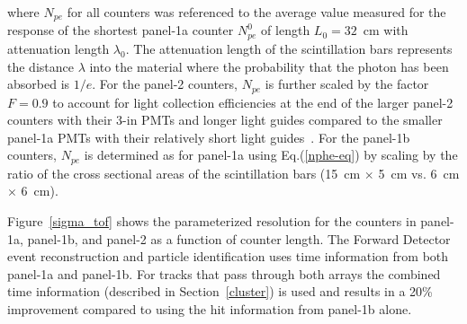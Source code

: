 \documentclass[final,3p,twocolumn]{elsarticle}
\begin{document}
\noindent
where $N_{pe}$ for all counters was referenced to the average value measured for the response of
the shortest panel-1a counter $N_{pe}^0$ of length $L_0=32$~cm with attenuation length $\lambda_0$.
The attenuation length of the scintillation bars represents the distance $\lambda$ into the material
where the probability that the photon has been absorbed is $1/e$. For the panel-2 counters, $N_{pe}$
is further scaled by the factor $F = 0.9$ to account for light collection efficiencies at the end of the
larger panel-2 counters with their 3-in PMTs and longer light guides compared to the smaller panel-1a
PMTs with their relatively short light guides~\cite{tof-nim}. For the panel-1b counters, $N_{pe}$ is
determined as for panel-1a using Eq.(\ref{nphe-eq}) by scaling by the ratio of the cross sectional areas
of the scintillation bars (15~cm $\times$ 5~cm vs. 6~cm $\times$ 6~cm). 

Figure~\ref{sigma_tof} shows the parameterized resolution for the counters in panel-1a, panel-1b,
and panel-2 as a function of counter length. The Forward Detector event reconstruction and particle
identification uses time information from both panel-1a and panel-1b. For tracks that pass through both
arrays the combined time information (described in Section~\ref{cluster}) is used and results in a 20\%
improvement compared to using the hit information from panel-1b alone.
\end{document}

